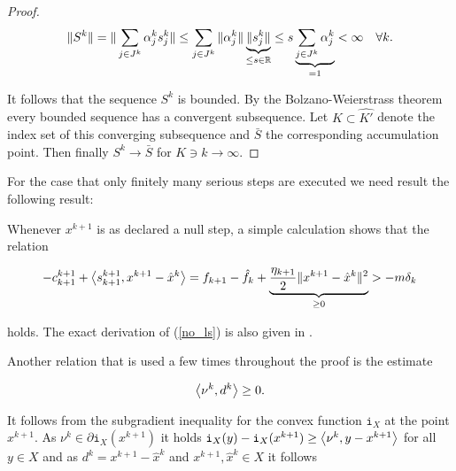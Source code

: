 \begin{proof}
		\[\|S^k\| = \|\sum_{j \in J^k}{\alpha_j^k s_j^k}\| \leq  \sum_{j \in J^k}{\|\alpha_j^k\|\underbrace{\|s^k_j\|}_{\leq s \in \mathbb{R}}} \leq s\underbrace{\sum_{j \in J^k}{\alpha_j^k}}_{=1} < \infty \quad \forall k. \]
		
		It follows that the sequence \(S^k\) is bounded.
		By the Bolzano-Weierstrass theorem every bounded sequence has a convergent subsequence. Let \(K \subset \hat{K'}\) denote the index set of this converging subsequence and \(\bar{S}\) the corresponding accumulation point. Then finally \(S^k \to \bar{S}\) for \(K \ni k\to \infty\).
		
	
\end{proof}


For the case that only finitely many serious steps are executed we need result the following result:


Whenever \(x^{k+1}\) is as declared a null step, a simple calculation shows that the relation 

\begin{equation}
	-c^{k+1}_{k+1} + \left\langle s^{k+1}_{k+1}, x^{k+1}-\hat{x}^k\right\rangle = f_{k+1}-\hat{f}_k + \underbrace{\frac{\eta_{k+1}}{2}\|x^{k+1}-\hat{x}^{k}\|^2}_{\geq 0}>-m\delta_k
\label{no_ls}
\end{equation}

holds.
The exact derivation of (\ref{no_ls}) is also given in \cite{Hare2016}.

Another relation that is used a few times throughout the proof is the estimate

\begin{equation}
	\left\langle \nu^k, d^k \right\rangle \geq 0.
\label{subgr_ineq}
\end{equation}

It follows from the subgradient inequality for the convex function \(\mathtt{i}_X\) at the point \(x^{k+1}\). As \(\nu^k \in \partial \mathtt{i}_X(x^{k+1})\) it holds \(\mathtt{i}_X(y)-\mathtt{i}_X(x^{k+1}) \geq \left\langle\nu^k,y-x^{k+1}\right\rangle\) for all \(y \in X\) and as \(d^k = x^{k+1}-\hat{x}^k\) and \(x^{k+1}, \hat{x}^k \in X\) it follows

